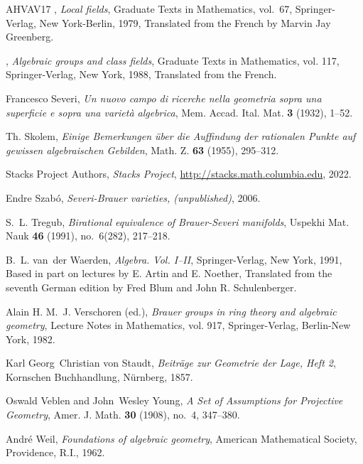 \documentclass{amsart}
\theoremstyle{definition}
\theoremstyle{remark}
\begin{document}
\begin{thebibliography}{AHVAV17}
\bysame, \emph{Local fields}, Graduate Texts in Mathematics, vol.~67,
  Springer-Verlag, New York-Berlin, 1979, Translated from the French by Marvin
  Jay Greenberg. 

\bysame, \emph{Algebraic groups and class fields}, Graduate Texts in
  Mathematics, vol. 117, Springer-Verlag, New York, 1988, Translated from the
  French. 

Francesco Severi, \emph{Un nuovo campo di ricerche nella geometria sopra una
  superficie e sopra una variet{\`a} algebrica}, Mem. Accad. Ital. Mat.
  \textbf{3} (1932), 1--52.

Th. Skolem, \emph{Einige {B}emerkungen \"uber die {A}uffindung der rationalen
  {P}unkte auf gewissen algebraischen {G}ebilden}, Math. Z. \textbf{63} (1955),
  295--312. 

{Stacks Project Authors}, \emph{{S}tacks {P}roject},
  \url{http://stacks.math.columbia.edu}, 2022.

Endre Szab{\'o}, \emph{Severi-{B}rauer varieties, (unpublished)}, 2006.

S.~L. Tregub, \emph{Birational equivalence of {B}rauer-{S}everi manifolds},
  Uspekhi Mat. Nauk \textbf{46} (1991), no.~6(282), 217--218. 

B.~L. van~der Waerden, \emph{Algebra. {V}ol. {I--II}}, Springer-Verlag, New
  York, 1991, Based in part on lectures by E. Artin and E. Noether, Translated
  from the seventh German edition by Fred Blum and John R. Schulenberger.

Alain H. M.~J. Verschoren (ed.), \emph{Brauer groups in ring theory and
  algebraic geometry}, Lecture Notes in Mathematics, vol. 917, Springer-Verlag,
  Berlin-New York, 1982. 

Karl Georg~Christian von Staudt, \emph{Beitr{\"a}ge zur {G}eometrie der {L}age,
  {H}eft 2}, Kornschen {B}uchhandlung, {N}{\"u}rnberg, 1857.

Oswald Veblen and John~Wesley Young, \emph{A {S}et of {A}ssumptions for
  {P}rojective {G}eometry}, Amer. J. Math. \textbf{30} (1908), no.~4, 347--380.

Andr{\'e} Weil, \emph{Foundations of algebraic geometry}, American Mathematical
  Society, Providence, R.I., 1962. 


\end{thebibliography}
\end{document}
